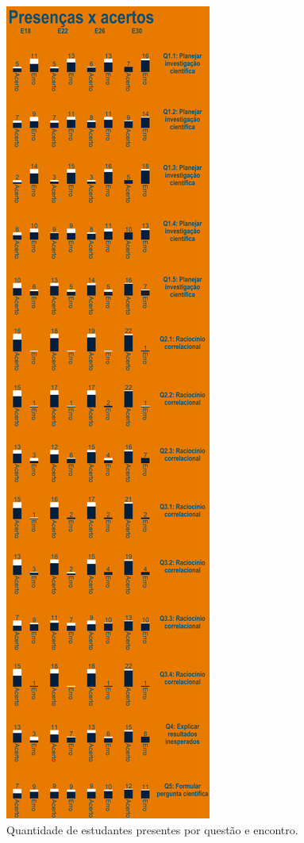 \documentclass[
]{book}
\begin{document}
\begin{figure}

{\centering \includegraphics[width=0.75\linewidth,height=0.75\textheight]{images/Impactos/38} 

}

\caption{Quantidade de estudantes presentes por questão e encontro.}\label{fig:impacto38}
\end{figure}
\end{document}

